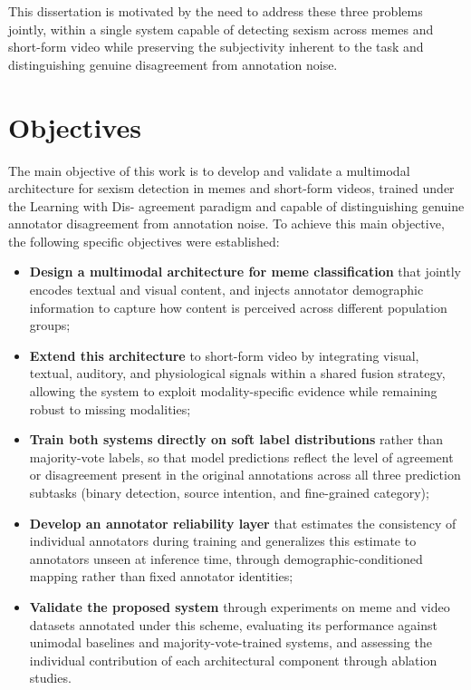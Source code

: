This dissertation is motivated by the need to address these three problems jointly, within
a single system capable of detecting sexism across memes and short-form video while
preserving the subjectivity inherent to the task and distinguishing genuine disagreement
from annotation noise.

\section{Objectives}\label{sec:objectives}
The main objective of this work is to develop and validate a multimodal architecture for
sexism detection in memes and short-form videos, trained under the Learning with Dis-
agreement paradigm and capable of distinguishing genuine annotator disagreement from
annotation noise. To achieve this main objective, the following specific objectives were
established:

\begin{itemize}
    \item \textbf{Design a multimodal architecture for meme classification} that jointly encodes
    textual and visual content, and injects annotator demographic information to capture
    how content is perceived across different population groups;

    \item \textbf{Extend this architecture} to short-form video by integrating visual, textual, auditory, and physiological signals within a shared fusion strategy, allowing the system to
    exploit modality-specific evidence while remaining robust to missing modalities;

    \item \textbf{Train both systems directly on soft label distributions} rather than majority-vote
    labels, so that model predictions reflect the level of agreement or disagreement present
    in the original annotations across all three prediction subtasks (binary detection, source
    intention, and fine-grained category);

    \item \textbf{Develop an annotator reliability layer} that estimates the consistency of individual
    annotators during training and generalizes this estimate to annotators unseen at inference time, through demographic-conditioned mapping rather than fixed annotator
    identities;

    \item \textbf{Validate the proposed system} through experiments on meme and video datasets
    annotated under this scheme, evaluating its performance against unimodal baselines
    and majority-vote-trained systems, and assessing the individual contribution of each
    architectural component through ablation studies.
\end{itemize}

